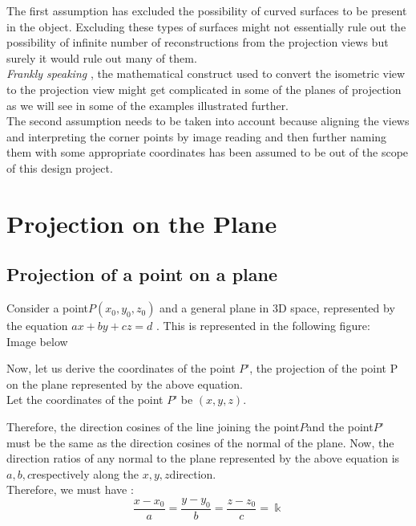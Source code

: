 \documentclass[12pt]{report}
\begin{document}
The first assumption has excluded the possibility of curved surfaces to be present in the object. Excluding these types of surfaces might not essentially rule out the possibility of infinite number of reconstructions from the projection views but surely it would rule out many of them. 
\\
\vspace{0.2cm}
\hspace{1cm} \textit{ Frankly speaking } , the mathematical construct used to convert the isometric view to the projection view might get complicated in some of the planes of projection as we will see in some of the examples illustrated further.
\\
\vspace{0.2cm}
The second assumption needs to be taken into account because aligning the views and interpreting the corner points by image reading and then further naming them with some appropriate coordinates has been assumed to be out of the scope of this design project.
\\

\section{Projection on the Plane}

\subsection{Projection of a point on a plane}

Consider a point$ P (x_{0}, y_{0}, z_{0}) $ and a general plane in 3D space, represented by the equation $ax + by + cz = d$ .  This is represented in the following figure: \\
{Image below}
\vspace{4cm}

Now, let us derive the coordinates of the point $P’$, the projection of the point P on the plane  represented by the above equation.
\\
\vspace{0.3cm}
Let the coordinates of the point $ P’ $ be $(x, y, z)$.
\\
\vspace{0.3cm}

Therefore, the direction cosines of the line joining the point$ P $and the point$ P’$ must be the same as the direction cosines of the normal of the plane. Now, the direction ratios of any normal to the plane represented by the above equation is $a, b, c $respectively along the $x, y, z $direction.
\\
\vspace{0.3cm}
Therefore, we must have : 
\[ \dfrac{x - x_{0}}{a} = \dfrac{y - y_{0}}{b} = \dfrac{z - z_{0}}{c} = \Bbbk \]
\end{document}
